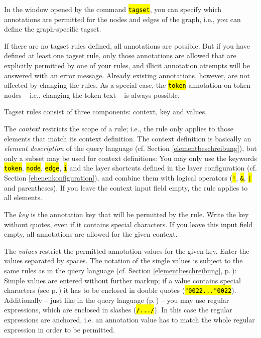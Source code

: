 \documentclass[12pt]{scrartcl}
\newcommand{\quo}{\char"0022}
\newcommand{\code}[1]{\hl{\texttt{#1}}}
\begin{document}
In the window opened by the command \code{tagset}, you can specify which annotations are permitted for the nodes and edges of the graph, i.e., you can define the graph-specific tagset.

If there are no tagset rules defined, all annotations are possible.
But if you have defined at least one tagset rule, only those annotations are allowed that are explicitly permitted by one of your rules, and illicit annotation attempts will be answered with an error message.
Already existing annotations, however, are not affected by changing the rules.
As a special case, the \code{token} annotation on token nodes – i.e., changing the token text – is always possible.

Tagset rules consist of three components: context, key and values.

The \textit{context} restricts the scope of a rule; i.e., the rule only applies to those elements that match its context definition.
The context definition is basically an \textit{element description} of the query language (cf. Section \ref{elementbeschreibung}), but only a subset may be used for context definitions:
You may only use the keywords \code{token}, \code{node}, \code{edge}, \code{i} and the layer shortcuts defined in the layer configuration (cf. Section \ref{ebenenkonfiguration}), and combine them with logical operators (\code{!}, \code{\&}, \code{|} and parentheses).
If you leave the context input field empty, the rule applies to all elements.

The \textit{key} is the annotation key that will be permitted by the rule.
Write the key without quotes, even if it contains special characters.
If you leave this input field empty, all annotations are allowed for the given context.

The \textit{values} restrict the permitted annotation values for the given key.
Enter the values separated by spaces.
The notation of the single values is subject to the same rules as in the query language (cf. Section \ref{elementbeschreibung}, p.\,\pageref{zeichenketten}):
Simple values are entered without further markup; if a value contains special characters (see p.\,\pageref{zeichenketten}) it has to be enclosed in double quotes (\code{\quo...\quo}).
Additionally – just like in the query language (p.\,\pageref{zeichenketten}) – you may use regular expressions, which are enclosed in slashes (\code{/.../}).
In this case the regular expressions are anchored, i.e. an annotation value has to match the whole regular expression in order to be permitted.
\end{document}
